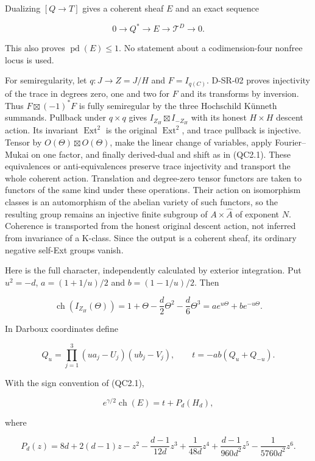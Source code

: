 Dualizing \([Q\to T]\) gives a coherent sheaf \(E\) and an exact
sequence

\[
 0\longrightarrow Q^*\longrightarrow E\longrightarrow\mathcal T^D
 \longrightarrow0.
 \tag{QC2.3}
\]

This also proves \(\operatorname{pd}(E)\le 1\). No statement about a
codimension-four nonfree locus is used.

For semiregularity, let \(q:J\to Z=J/H\) and \(F=I_{q(C)}\). D-SR-02
proves injectivity of the trace in degrees zero, one and two for \(F\)
and its transforms by inversion. Thus \(F\boxtimes (-1)^*F\) is fully
semiregular by the three Hochschild Künneth summands. Pullback under
\(q\times q\) gives \(I_{Z_H}\boxtimes I_{-Z_H}\) with its honest
\(H\times H\) descent action. Its invariant \(\operatorname{Ext}^{2}\)
is the original \(\operatorname{Ext}^{2}\), and trace pullback is
injective. Tensor by \(O(\Theta )\boxtimes O(\Theta )\), make the linear
change of variables, apply Fourier--Mukai on one factor, and finally
derived-dual and shift as in (QC2.1). These equivalences or
anti-equivalences preserve trace injectivity and transport the whole
coherent action. Translation and degree-zero tensor functors are taken
to functors of the same kind under these operations. Their action on
isomorphism classes is an automorphism of the abelian variety of such
functors, so the resulting group remains an injective finite subgroup of
\(A\times \widehat{A}\) of exponent \(N\). Coherence is transported from
the honest original descent action, not inferred from invariance of a
K-class. Since the output is a coherent sheaf, its ordinary negative
self-Ext groups vanish.

Here is the full character, independently calculated by exterior
integration. Put \(u^{2}=-d\), \(a=(1+1/u)/2\) and \(b=(1-1/u)/2\). Then

\[
 \operatorname{ch}(I_{Z_H}(\Theta))
 =1+\Theta-\frac d2\Theta^2-\frac d6\Theta^3
 =a e^{u\Theta}+b e^{-u\Theta}.
\]

In Darboux coordinates define

\[
 Q_u=\prod_{j=1}^3(u a_j-U_j)(u b_j-V_j),\qquad
 t=-ab(Q_u+Q_{-u}).
\]

With the sign convention of (QC2.1),

\[
 e^{\gamma/2}\operatorname{ch}(E)=t+P_d(H_d),
 \tag{QC2.4}
\]

where

\[
 P_d(z)=8d+2(d-1)z-z^2-\frac{d-1}{12d}z^3
     +\frac1{48d}z^4+\frac{d-1}{960d^2}z^5
     -\frac1{5760d^2}z^6.
 \tag{QC2.5}
\]

